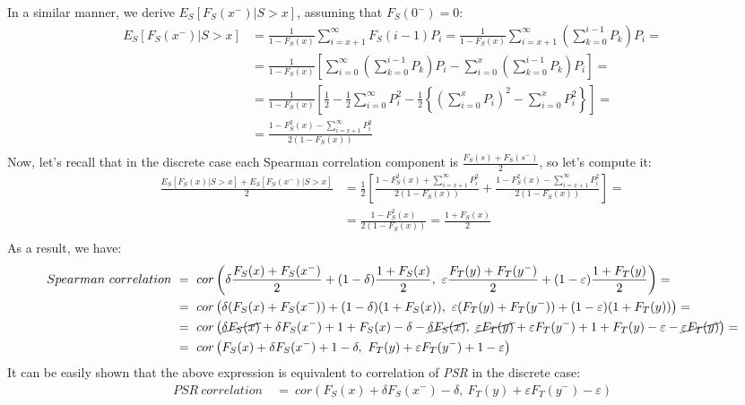 \documentclass[]{article}
\let\epsilon\varepsilon
\begin{document}
In a similar manner, we derive $E_S[F_S(x^-)|S>x]$, assuming that $F_S(0^-)=0$:
	$$
	\begin{aligned}
		E_S[F_S(x^-)|S>x] &= \frac{1}{1-F_S(x)} \sum_{i=x+1}^{\infty}F_S(i-1)P_i = \frac{1}{1-F_S(x)}\sum_{i=x+1}^{\infty}\left( \sum_{k=0}^{i-1}P_k \right)P_i =\\
		 &= \frac{1}{1-F_S(x)}\left[ \sum_{i=0}^{\infty}\left( \sum_{k=0}^{i-1}P_k \right)P_i - \sum_{i=0}^{x}\left( \sum_{k=0}^{i-1}P_k \right)P_i   \right] = \\
		 &= \frac{1}{1-F_S(x)}\left[ \frac{1}{2} - \frac{1}{2}\sum_{i=0}^{\infty}P_i^2 -  \frac{1}{2} \left\{ \left(\sum_{i=0}^{x}P_i\right)^2 - \sum_{i=0}^{x}P_i^2  \right\}    \right] = \\
		 &= \frac{ 1 - F_S^2(x) - \sum_{i=x+1}^{\infty}P_i^2 }{2(1-F_S(x))}\\
	\end{aligned}
	$$
Now, let's recall that in the discrete case each Spearman correlation component is $\frac{F_S(s) + F_S(s^-)}{2}$, so let's compute it:
	$$
	\begin{aligned}
	  \frac{E_S[F_S(x)|S>x] + E_S[F_S(x^-)|S>x]}{2} &= \frac{1}{2}\left[\frac{ 1 - F_S^2(x) + \sum_{i=x+1}^{\infty}P_i^2 }{2(1-F_S(x))}   +   \frac{ 1 - F_S^2(x) - \sum_{i=x+1}^{\infty}P_i^2 }{2(1-F_S(x))}\right]=\\
		&= \frac{1 - F_S^2(x)}{2(1-F_S(x))}= \frac{1 + F_S(x)}{2}\\
	\end{aligned}
	$$
As a result, we have:
	$$
	\begin{aligned}
		Spearman~correlation~&=~ cor\left(  \delta\frac{F_S(x) + F_S(x^-)}{2} + (1-\delta) \frac{1 + F_S(x)}{2}, ~\epsilon\frac{F_T(y) + F_T(y^-)}{2} + (1-\epsilon) \frac{1 + F_T(y)}{2} \right)=\\
		&=~ cor\left(  \delta( F_S(x) + F_S(x^-)) + (1-\delta) (1 + F_S(x)), ~\epsilon (F_T(y) + F_T(y^-)) + (1-\epsilon) (1 + F_T(y)) \right)=\\
		&=~ cor\left( \cancel{\delta F_S(x)} + \delta F_S(x^-) +  1 + F_S(x) -\delta - \cancel{\delta F_S(x)}, ~\cancel{\epsilon F_T(y)} + \epsilon F_T(y^-) + 1 + F_T(y)-\epsilon -\cancel{\epsilon F_T(y)}   \right)=\\
		&=~ cor\left( F_S(x) + \delta F_S(x^-) +  1 -\delta , ~ F_T(y) + \epsilon F_T(y^-) + 1 -\epsilon   \right)\\
	\end{aligned}
	$$
It can be easily shown that the above expression is equivalent to correlation of \emph{PSR} in the discrete case:
	$$
	\begin{aligned}
		PSR~correlation~&=~ cor\left(  F_S(x) + \delta F_S(x^-) -\delta,~F_T(y) + \epsilon F_T(y^-) -\epsilon  \right)\\
	\end{aligned}
	$$
\end{document}
